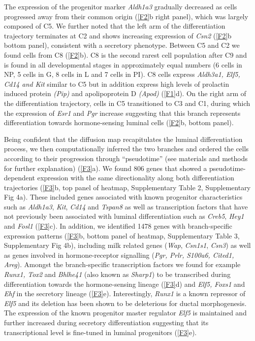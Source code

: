 \documentclass[titlepage, 12pt, oneside]{amsart}
\begin{document}
The expression of the progenitor marker \textit{Aldh1a3} gradually decreased as cells progressed away from their common origin (\autoref{F2}b right panel), which was largely composed of C5.
We further noted that the left arm of the differentiation trajectory terminates at C2 and shows increasing expression of \textit{Csn2} (\autoref{F2}b bottom panel), consistent with a secretory phenotype.
Between C5 and C2 we found cells from C8 (\autoref{F2}b).
C8 is the second rarest cell population after C9 and is found in all developmental stages in approximately equal numbers (6 cells in NP, 5 cells in G, 8 cells in L and 7 cells in PI).
C8 cells express \textit{Aldh3a1, Elf5, Cd14 and Kit} similar to C5 but in addition express high levels of prolactin induced protein \textit{(Pip)} and apolipoprotein D \textit{(Apod)} (\autoref{F1}d).
On the right arm of the differentiation trajectory, cells in C5 transitioned to C3 and C1, during which the expression of \textit{Esr1} and \textit{Pgr} increase suggesting that this branch represents differentiation towards hormone-sensing luminal cells (\autoref{F2}b, bottom panel).

Being confident that the diffusion map recapitulates the luminal differentiation process, we then computationally inferred the two branches and ordered the cells according to their progression through ``pseudotime''\autocite{Haghverdi2016} (see materials and methods for further explanation) (\autoref{F3}a).
We found 806 genes that showed a pseudotime-dependent expression with the same directionality along both differentiation trajectories (\autoref{F3}b, top panel of heatmap, Supplementary Table 2, Supplementary Fig 4a).
These included genes associated with known progenitor characteristics such as \textit{Aldh1a3}, \textit{Kit}, \textit{Cd14} and \textit{Tspan8} as well as transcription factors that have not previously been associated with luminal differentiation such as \textit{Creb5}, \textit{Hey1} and \textit{Fosl1} (\autoref{F3}c).
In addition, we identified 1478 genes with branch-specific expression patterns (\autoref{F3}b, bottom panel of heatmap, Supplementary Table 3, Supplementary Fig 4b), including milk related genes (\textit{Wap}, \textit{Csn1s1}, \textit{Csn3}) as well as genes involved in hormone-receptor signalling (\textit{Pgr, Prlr, S100a6, Cited1, Areg}).
Amongst the branch-specific transcription factors we found for example \textit{Runx1, Tox2} and \textit{Bhlhe41} (also known as \textit{Sharp1}) to be transcribed during differentiation towards the hormone-sensing lineage (\autoref{F3}d) and \textit{Elf5, Foxs1} and \textit{Ehf} in the secretory lineage (\autoref{F3}e).
Interestingly, \textit{Runx1} is a known repressor of \textit{Elf5} and its deletion has been shown to be deleterious for ductal morphogenesis\autocite{VanBragt2014}.
The expression of the known progenitor master regulator \textit{Elf5} is maintained and further increased during secretory differentiation suggesting that its transcriptional level is fine-tuned in luminal progenitors (\autoref{F3}e).
\end{document}
